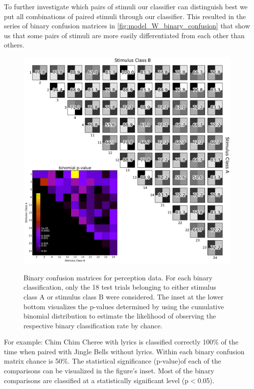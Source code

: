 To further investigate which pairs of stimuli our classifier can distinguish best we put all combinations of paired stimuli through our classifier.
This resulted in the series of binary confusion matrices in \autoref{fig:model_W_binary_confusion} that show us that some pairs of stimuli are more easily differentiated from each other than others. 
\begin{figure}[htb] 
  \begin{center}
    \includegraphics[width=.75\textwidth,keepaspectratio=true]{Figures/model_W_binary_confusion}
   \\\vspace{-0.8em}
    \caption{Binary confusion matrices for perception data.
    For each binary classification, only the 18 test trials belonging to either stimulus class A or stimulus class B were considered.
    The inset at the lower bottom visualizes the p-values determined by using the cumulative binomial distribution to estimate the likelihood of observing the respective binary classification rate by chance.}
    \label{fig:model_W_binary_confusion}
  \end{center}
  \vspace{-1em}
\end{figure}
For example: Chim Chim Cheree with lyrics is classified correctly 100\% of the time when paired with Jingle Bells without lyrics. 
Within each binary confusion matrix chance is 50\%.
The statistical significance (p-value)of each of the comparisons can be visualized in the figure's inset. 
Most of the binary comparisons are classified at a statistically significant level (p$<$0.05). 

